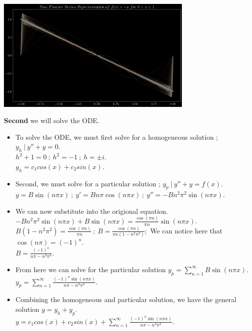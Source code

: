 \documentclass[10pt]{article}
\begin{document}
\begin{center}
    \includegraphics[width=0.72\textwidth]{img/2_1.png} \\
\end{center}

\newpage

\noindent
\textbf{Second} we will solve the ODE. \\

\begin{itemize}
    \item To solve the ODE, we must first solve for a homogeneous solution ; $ \displaystyle y_h \ | \ y'' + y = 0 $. \\
    \subitem $ \displaystyle h^2 + 1 = 0 \ ; \ h^2 = -1 \ ; \ h = \pm i $. \\
    \subitem $ \displaystyle y_h = c_1 cos{(x)} + c_2 sin{(x)} $. \\
    \item Second, we must solve for a particular solution ; $ y_p \ | \ y'' + y = f(x) $. \\
    \subitem $ \displaystyle y = B\sin{(n\pi x)} \ ; \ y' = Bn\pi\cos{(n\pi x)} \ ; \ y'' = -Bn^2\pi^2\sin{(n\pi x)} $. \\
    \item We can now substitute into the origional equation. \\
    \subitem $ \displaystyle -Bn^2\pi^2\sin{(n\pi x)} + B\sin{(n\pi x)} = \frac{\cos(\pi n)}{\pi n} \sin{(n\pi x)} $. \\
    \subitem $ \displaystyle B(1 - n^2\pi^2) = \frac{\cos(\pi n)}{\pi n} \ ; \ B = \frac{\cos(\pi n)}{\pi n(1 - n^2\pi^2)} ; $ We can notice here that $ \cos{(n\pi)} = (-1)^n $. \\
    \subitem $ \displaystyle B = \frac{(-1)^n}{n\pi - n^3\pi^3} $. \\
    \item From here we can solve for the particular solution $ \displaystyle y_p = \sum_{n = 1}^{\infty} B \sin (n\pi x) $. \\
    \subitem $ \displaystyle y_p = \sum_{n = 1}^{\infty} \frac{(-1)^n\sin (n\pi x)}{n\pi - n^3\pi^3} $. \\
    \item Combining the homogeneous and particular solution, we have the general solution $ \displaystyle y = y_h + y_p $. \\
    \subitem  $ \displaystyle y = c_1 cos{(x)} + c_2 sin{(x)} + \sum_{n = 1}^{\infty} \frac{(-1)^n\sin (n\pi x)}{n\pi - n^3\pi^3} $. \\
\end{itemize}
\end{document}
